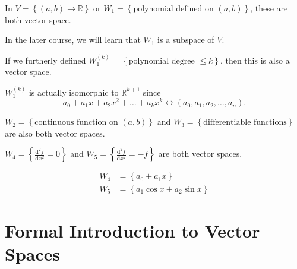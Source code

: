 \begin{eg}
    In \(V = \left\{ (a,b) \to \mathbb{R}  \right\} \) or \(W_1 = \left\{ \text{polynomial defined on } (a, b) \right\} \), these are both vector space. 
\end{eg}
\begin{remark}
    In the later course, we will learn that \(W_1\) is a subspace of \(V\).  
\end{remark}

\begin{eg}
    If we furtherly defined \(W_1^{(k)} = \left\{ \text{polynomial degree } \le k \right\} \), then this is also a vector space. 
\end{eg}

\begin{remark}
    \(W_1^{(k)}\) is actually isomorphic to \(\mathbb{R} ^{k+1}\) since
    \[
        a_0 + a_{1}x + a_2 x^2 + \dots + a_k x^k \leftrightarrow (a_0, a_1, a_2, \dots , a_n). 
    \]  
\end{remark}

\begin{eg}
    \(W_2 = \left\{ \text{continuous function on } (a,b) \right\} \) and \(W_3 = \left\{  \text{differentiable functions} \right\} \) are also both vector spaces.  
\end{eg}

\begin{eg}
    \(W_4 = \left\{ \frac{\mathrm{d}^2 f}{\mathrm{d}x^2} = 0  \right\} \) and \(W_5 = \left\{ \frac{\mathrm{d} ^2 f}{\mathrm{d}x ^2} = -f  \right\} \) are both vector spaces. 
\end{eg}
\begin{explanation}
    \begin{align*}
        W_4 &= \left\{ a_0 + a_1 x \right\} \\
        W_5 &= \left\{ a_1 \cos x + a_2 \sin x \right\} 
    \end{align*}
\end{explanation}

\chapter{Formal Introduction to Vector Spaces}
